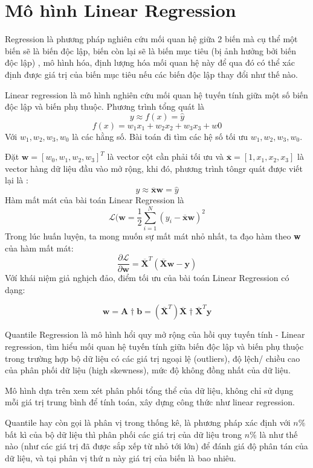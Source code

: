 \section{Mô hình Linear Regression}
Regression là phương pháp nghiên cứu mối quan hệ giữa 2 biến mà cụ thể một biến sẽ là biến độc lập, biến còn lại sẽ là biến mục tiêu (bị ảnh hưởng bởi biến độc lập) , mô hình hóa, định lượng hóa mối quan hệ này để qua đó có thể xác định được giá trị của biến mục tiêu nếu các biến độc lập thay đổi như thế nào.\par
Linear regression là mô hình nghiên cứu mối quan hệ tuyến tính giữa một số biến độc lập và biến phụ thuộc. Phương trình tổng quát là 
$$y \approx f(x) = \hat{y}$$
$$f(x) = w_1x_1+w_2x_2+ w_3x_3+w0$$
Với $w_1,w_2,w_3, w_0$ là các hằng số. Bài toán đi tìm các hệ số tối ưu ${w_1,w_2,w_3, w_0}$.\par
Đặt $\textbf{w}= [w_0,w_1,w_2,w_3]^T$ là vector cột cần phải tối ưu và $\overline{\textbf{x}}=[1,x_1,x_2,x_3]$ là vector hàng dữ liệu đầu vào mở rộng, khi đó, phương trình tôngr quát được viết lại là :$$y \approx \overline{\textbf{x}}\textbf{w}  = \hat{y}$$
Hàm mất mát của bài toán Linear Regression là 
$$ \mathcal{L}(\textbf{w}=\dfrac{1}{2}\sum_{i=1}^{N}(y_i-\overline{\textbf{x}}\textbf{w})^2$$
Trong lúc huấn luyện, ta mong muốn sự mất mát nhỏ nhất, ta đạo hàm theo \textbf{w} của hàm mất mát:
$$\dfrac{\partial \mathcal{L}}{\partial \textbf{w}}= \overline{\textbf{X}}^T(\overline{\textbf{X}}\textbf{w}-\textbf{y})$$
Vớí khái niệm giả nghịch đảo, điểm tối ưu của bài toán Linear Regression có dạng:

$$\textbf{w} = \textbf{A}\dagger \textbf{b} = (\overline{\textbf{X}}^T )\overline{\textbf{X}} \dagger \overline{\textbf{X}}^T \textbf{y}$$ 

Quantile Regression là mô hình hổi quy mở rộng của hồi quy tuyến tính - Linear regression, tìm hiểu mối quan hệ tuyến tính giữa biến độc lập và biến phụ thuộc trong trường hợp bộ dữ liệu có các giá trị ngoại lệ (outliers), độ lệch/ chiều cao của phân phối dữ liệu (high skewness), mức độ không đồng nhất của dữ liệu.\par
Mô hình dựa trên xem xét phân phối tổng thể của dữ liệu, không chỉ sử dụng mỗi giá trị trung bình để tính toán, xây dựng công thức như linear regression.\par

Quantile hay còn gọi là phân vị trong thống kê, là phương pháp xác định với $n\%$ bất kì của bộ dữ liệu thì phân phối các giá trị của dữ liệu trong $n\%$ là như thế nào (như các giá trị đã được sắp xếp từ nhỏ tới lớn) để đánh giá độ phân tán của dữ liệu, và tại phân vị thứ n này giá trị của biến là bao nhiêu.\par

